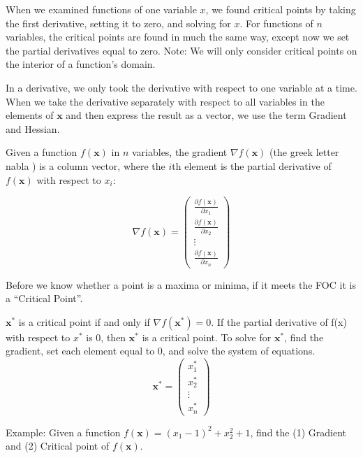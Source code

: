 \documentclass[]{book}
\theoremstyle{definition}
\theoremstyle{definition}
\theoremstyle{definition}
\theoremstyle{remark}
\let\BeginKnitrBlock\begin \let\EndKnitrBlock\end
\begin{document}
When we examined functions of one variable \(x\), we found critical
points by taking the first derivative, setting it to zero, and solving
for \(x\). For functions of \(n\) variables, the critical points are
found in much the same way, except now we set the partial derivatives
equal to zero. Note: We will only consider critical points on the
interior of a function's domain.

In a derivative, we only took the derivative with respect to one
variable at a time. When we take the derivative separately with respect
to all variables in the elements of \(\mathbf{x}\) and then express the
result as a vector, we use the term Gradient and Hessian.

\BeginKnitrBlock{definition}[Gradient]
\protect\hypertarget{def:unnamed-chunk-52}{}{\label{def:unnamed-chunk-52}
{} } Given a function \(f(\textbf{x})\) in \(n\)
variables, the gradient \(\nabla f(\mathbf{x})\) (the greek letter nabla
) is a column vector, where the \(i\)th element is the partial
derivative of \(f(\textbf{x})\) with respect to \(x_i\):

\[\nabla f(\mathbf{x}) = \begin{pmatrix}
\frac{\partial f(\mathbf{x})}{\partial x_1}\\ \frac{\partial f(\mathbf{x})}{\partial x_2}\\
  \vdots \\ \frac{\partial f(\mathbf{x})}{\partial x_n} \end{pmatrix}\]
\EndKnitrBlock{definition}

Before we know whether a point is a maxima or minima, if it meets the
FOC it is a ``Critical Point''.

\BeginKnitrBlock{definition}[Critical Point]
\protect\hypertarget{def:unnamed-chunk-53}{}{\label{def:unnamed-chunk-53}
{} } \(\mathbf{x}^*\) is a critical point
if and only if \(\nabla f(\mathbf{x}^*)=0\). If the partial derivative
of f(x) with respect to \(x^*\) is 0, then \(\mathbf{x}^*\) is a
critical point. To solve for \(\mathbf{x}^*\), find the gradient, set
each element equal to 0, and solve the system of equations.
\[\mathbf{x}^* = \begin{pmatrix} x_1^*\\x_2^*\\ \vdots \\ x_n^*\end{pmatrix}\]
\EndKnitrBlock{definition}

\BeginKnitrBlock{example}
\protect\hypertarget{exm:unnamed-chunk-54}{}{\label{exm:unnamed-chunk-54} }
Example: Given a function \(f(\mathbf{x})=(x_1-1)^2+x_2^2+1\), find the
(1) Gradient and (2) Critical point of \(f(\mathbf{x})\).
\EndKnitrBlock{example}
\end{document}
